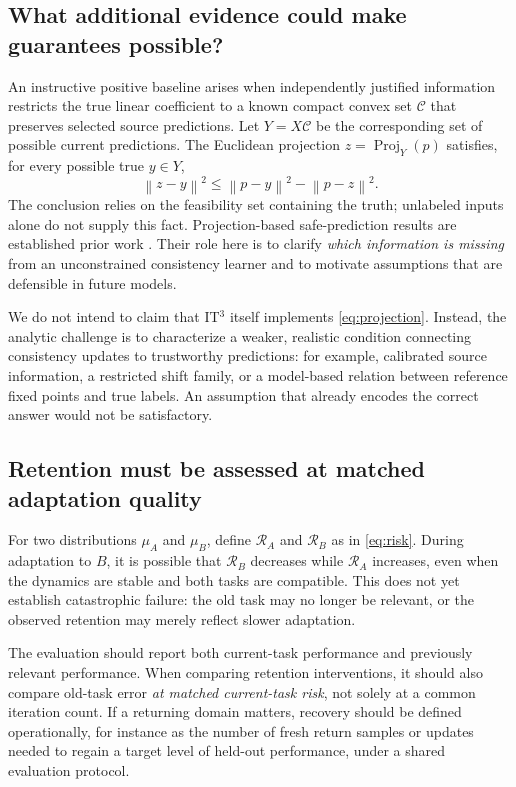 \documentclass[11pt,a4paper]{article}
\newcommand{\norm}[1]{\left\lVert#1\right\rVert}
\newcommand{\Risk}{\mathcal{R}}
\newcommand{\Proj}{\operatorname{Proj}}
\begin{document}
\subsection{What additional evidence could make guarantees possible?}
An instructive positive baseline arises when independently justified information restricts the true linear coefficient to a known compact convex set $\mathcal C$ that preserves selected source predictions. Let $Y=X\mathcal C$ be the corresponding set of possible current predictions. The Euclidean projection $z=\Proj_Y(p)$ satisfies, for every possible true $y\in Y$,
\begin{equation}
\norm{z-y}^2\leq\norm{p-y}^2-\norm{p-z}^2.
\label{eq:projection}
\end{equation}
The conclusion relies on the feasibility set containing the truth; unlabeled inputs alone do not supply this fact. Projection-based safe-prediction results are established prior work \cite{li2017}. Their role here is to clarify \emph{which information is missing} from an unconstrained consistency learner and to motivate assumptions that are defensible in future models.

We do not intend to claim that IT$^3$ itself implements \eqref{eq:projection}. Instead, the analytic challenge is to characterize a weaker, realistic condition connecting consistency updates to trustworthy predictions: for example, calibrated source information, a restricted shift family, or a model-based relation between reference fixed points and true labels. An assumption that already encodes the correct answer would not be satisfactory.

\subsection{Retention must be assessed at matched adaptation quality}
For two distributions $\mu_A$ and $\mu_B$, define $\Risk_A$ and $\Risk_B$ as in \eqref{eq:risk}. During adaptation to $B$, it is possible that $\Risk_B$ decreases while $\Risk_A$ increases, even when the dynamics are stable and both tasks are compatible. This does not yet establish catastrophic failure: the old task may no longer be relevant, or the observed retention may merely reflect slower adaptation.

The evaluation should report both current-task performance and previously relevant performance. When comparing retention interventions, it should also compare old-task error \emph{at matched current-task risk}, not solely at a common iteration count. If a returning domain matters, recovery should be defined operationally, for instance as the number of fresh return samples or updates needed to regain a target level of held-out performance, under a shared evaluation protocol.
\end{document}
